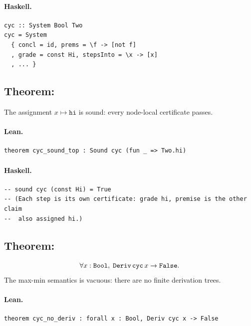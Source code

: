 \documentclass[11pt,a4paper]{article}
\begin{document}
\paragraph{Haskell.}
\begin{lstlisting}[style=haskell]
cyc :: System Bool Two
cyc = System
  { concl = id, prems = \f -> [not f]
  , grade = const Hi, stepsInto = \x -> [x]
  , ... }
\end{lstlisting}


\subsection{Theorem: }

\begin{thm}
The assignment $x \mapsto \mathtt{hi}$ is sound: every node-local certificate
passes.
\end{thm}

\paragraph{Lean.}
\begin{lstlisting}[style=lean]
theorem cyc_sound_top : Sound cyc (fun _ => Two.hi)
\end{lstlisting}

\paragraph{Haskell.}
\begin{lstlisting}[style=haskell]
-- sound cyc (const Hi) = True
-- (Each step is its own certificate: grade hi, premise is the other claim
--  also assigned hi.)
\end{lstlisting}


\subsection{Theorem: }

\begin{thm}
\[
  \forall x : \texttt{Bool},\; \texttt{Deriv}\,\texttt{cyc}\,x \to \texttt{False}.
\]
The max-min semantics is vacuous: there are no finite derivation trees.
\end{thm}

\paragraph{Lean.}
\begin{lstlisting}[style=lean]
theorem cyc_no_deriv : forall x : Bool, Deriv cyc x -> False
\end{lstlisting}
\end{document}

